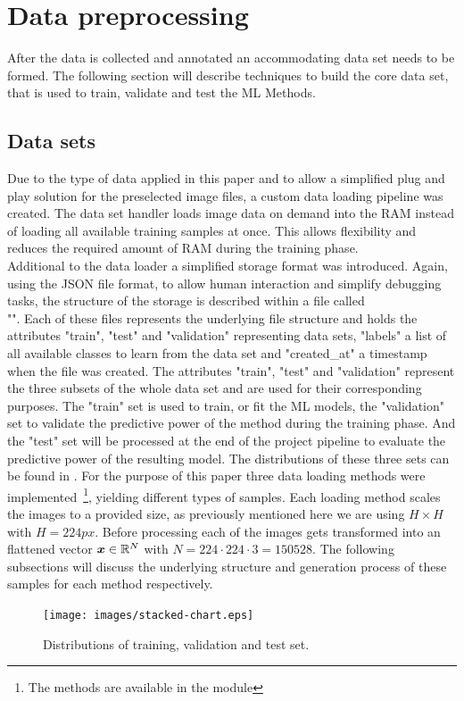 \section{Data preprocessing}\label{sec:data-preprocessing}
After the data is collected and annotated an accommodating data set needs to be formed.
The following section will describe techniques to build the core data set, that is used to train, validate and test the ML Methods.
\subsection{Data sets}\label{subsec:datasets}
Due to the type of data applied in this paper and to allow a simplified plug and play solution for the preselected image files, a custom data loading pipeline was created.
The data set handler loads image data on demand into the RAM instead of loading all available training samples at once.
This allows flexibility and reduces the required amount of RAM during the training phase.\\
Additional to the data loader a simplified storage format was introduced.
Again, using the JSON file format, to allow human interaction and simplify debugging tasks, the structure of the storage is described within a file called\\ "".
Each of these files represents the underlying file structure and holds the attributes "train", "test" and "validation" representing data sets, "labels" a list of all available classes to learn from the data set and "created\_at" a timestamp when the file was created.
The attributes "train", "test" and "validation" represent the three subsets of the whole data set and are used for their corresponding purposes.
The "train" set is used to train, or fit the ML models, the "validation" set to validate the predictive power of the method during the training phase.
And the "test" set will be processed at the end of the project pipeline to evaluate the predictive power of the resulting model.
The distributions of these three sets can be found in .
For the purpose of this paper three data loading methods were implemented~\footnote{The methods are available in the module }, yielding different types of samples.
Each loading method scales the images to a provided size, as previously mentioned here we are using $H\times H$ with $H=224px$.
Before processing each of the images gets transformed into an flattened vector $\bm{x}\in\mathbb{R}^N$ with $N=224\cdot 224\cdot3 = 150528$.
The following subsections will discuss the underlying structure and generation process of these samples for each method respectively.
\begin{figure}[!ht]
    \centering
    \texttt{[image: images/stacked-chart.eps]}
    \caption{Distributions of training, validation and test set.}
    \label{fig:set-distributions}
\end{figure}


